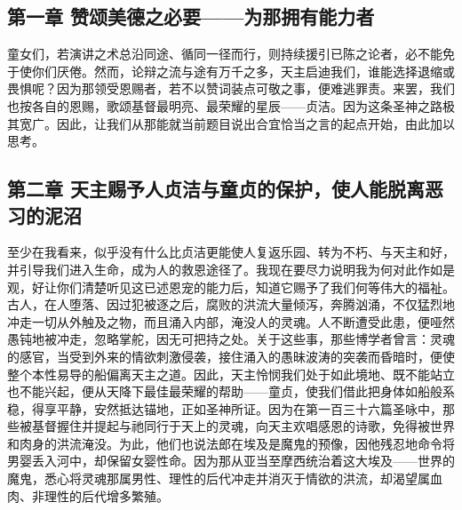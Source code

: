 \par


\subsection{第一章 赞颂美德之必要——为那拥有能力者}

童女们，若演讲之术总沿同途、循同一径而行，则持续援引已陈之论者，必不能免于使你们厌倦。然而，论辩之流与途有万千之多，天主启迪我们，谁能选择退缩或畏惧呢？因为那领受恩赐者，若不以赞词装点可敬之事，便难逃罪责。来罢，我们也按各自的恩赐，歌颂基督最明亮、最荣耀的星辰——贞洁。因为这条圣神之路极其宽广。因此，让我们从那能就当前题目说出合宜恰当之言的起点开始，由此加以思考。\par


\subsection{第二章 天主赐予人贞洁与童贞的保护，使人能脱离恶习的泥沼}

至少在我看来，似乎没有什么比贞洁更能使人复返乐园、转为不朽、与天主和好，并引导我们进入生命，成为人的救恩途径了。我现在要尽力说明我为何对此作如是观，好让你们清楚听见这已述恩宠的能力后，知道它赐予了我们何等伟大的福祉。古人，在人堕落、因过犯被逐之后，腐败的洪流大量倾泻，奔腾汹涌，不仅猛烈地冲走一切从外触及之物，而且涌入内部，淹没人的灵魂。人不断遭受此患，便哑然愚钝地被冲走，忽略掌舵，因无可把持之处。关于这些事，那些博学者曾言：灵魂的感官，当受到外来的情欲刺激侵袭，接住涌入的愚昧波涛的突袭而昏暗时，便使整个本性易导的船偏离天主之道。因此，天主怜悯我们处于如此境地、既不能站立也不能兴起，便从天降下最佳最荣耀的帮助——童贞，使我们借此把身体如船般系稳，得享平静，安然抵达锚地，正如圣神所证。因为在第一百三十六篇圣咏中，那些被基督握住并提起与祂同行于天上的灵魂，向天主欢唱感恩的诗歌，免得被世界和肉身的洪流淹没。为此，他们也说法郎在埃及是魔鬼的预像，因他残忍地命令将男婴丢入河中，却保留女婴性命。因为那从亚当至摩西统治着这大埃及——世界的魔鬼，悉心将灵魂那属男性、理性的后代冲走并消灭于情欲的洪流，却渴望属血肉、非理性的后代增多繁殖。\par


